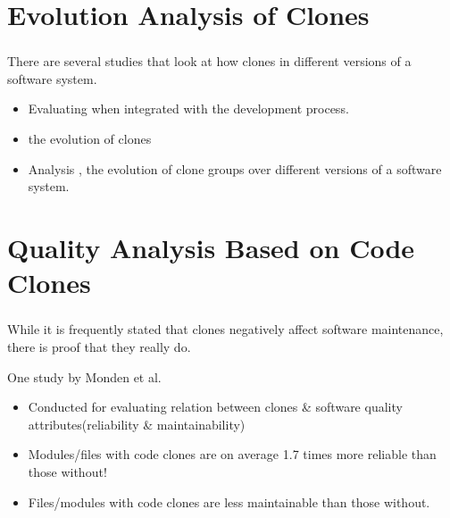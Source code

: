 \documentclass[pdf]{beamer}
\begin{document}
\section{Evolution Analysis of Clones}
\begin{frame}
\frametitle{\secname}
\begin{block}{}
There are several studies that look at how clones  in
different versions of a software system.
\end{block}
\begin{itemize}
  \item Evaluating  when
  integrated with the development process.
  \item {} the evolution of clones
  \item Analysis , the evolution of clone groups over
  different versions of a software system.
\end{itemize}
\end{frame}

\section{Quality Analysis Based on Code Clones}
\begin{frame}
\frametitle{\secname}
\begin{block}{}
While it is frequently stated that clones negatively affect
software maintenance, there is  proof that they
really do.
\end{block}
\pause
\begin{block}{One study by Monden et al.}
\begin{itemize}
  \item Conducted for evaluating relation between clones \& software
  quality attributes(reliability \& maintainability)
  \pause
  \item \alert{Modules\slash files with code clones are on average 1.7 times more
  reliable than those without!}
  \item Files/modules with code clones are less maintainable
than those without.
\end{itemize}
\end{block}
\end{frame}
\end{document}
